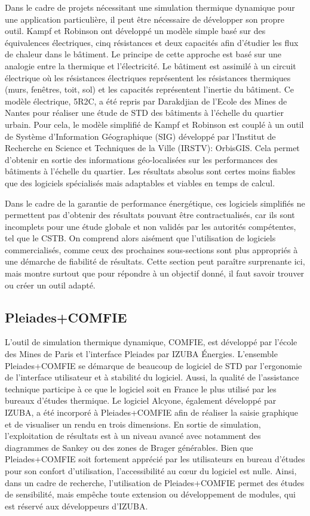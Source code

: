 Dans le cadre de projets nécessitant une simulation thermique dynamique pour une application particulière, il peut être nécessaire de développer son propre outil. Kampf et Robinson \cite{Kampf-07} ont développé un modèle simple basé sur des équivalences électriques, cinq résistances et deux capacités afin d'étudier les flux de chaleur dans le bâtiment. Le principe de cette approche est basé sur une analogie entre la thermique et l'électricité. Le bâtiment est assimilé à un circuit électrique où les résistances électriques représentent les résistances thermiques (murs, fenêtres, toit, sol) et les capacités représentent l'inertie du bâtiment. Ce modèle électrique, 5R2C, a été repris par Darakdjian \cite{Darakdjian-13} de l'Ecole des Mines de Nantes pour réaliser une étude de STD des bâtiments à l'échelle du quartier urbain. Pour cela, le modèle simplifié de Kampf et Robinson est couplé à un outil de Système d'Information Géographique (SIG) développé par l'Institut de Recherche en Science et Techniques de la Ville (IRSTV): OrbisGIS. Cela permet d'obtenir en sortie des informations géo-localisées sur les performances des bâtiments à l'échelle du quartier. Les résultats absolus sont certes moins fiables que des logiciels spécialisés mais adaptables et viables en temps de calcul.

Dans le cadre de la garantie de performance énergétique, ces logiciels simplifiés ne permettent pas d'obtenir des résultats pouvant être contractualisés, car ils sont incomplets pour une étude globale et non validés par les autorités compétentes, tel que le CSTB. On comprend alors aisément que l'utilisation de logiciels commercialisés, comme ceux des prochaines sous-sections sont plus appropriés à une démarche de fiabilité de résultats. Cette section peut paraître surprenante ici, mais montre surtout que pour répondre à un objectif donné, il faut savoir trouver ou créer un outil adapté.

\subsection*{Pleiades+COMFIE}

L'outil de simulation thermique dynamique, COMFIE, est développé par l'école des Mines de Paris et l'interface Pleiades par IZUBA Énergies. L'ensemble Pleiades+COMFIE se démarque de beaucoup de logiciel de STD par l'ergonomie de l'interface utilisateur et à stabilité du logiciel. Aussi, la qualité de l'assistance technique participe à ce que le logiciel soit en France le plus utilisé par les bureaux d'études thermique. Le logiciel Alcyone, également développé par IZUBA, a été incorporé à Pleiades+COMFIE afin de réaliser la saisie graphique et de visualiser un rendu en trois dimensions. En sortie de simulation, l'exploitation de résultats est à un niveau avancé avec notamment des diagrammes de Sankey ou des zones de Brager générables.
Bien que Pleiades+COMFIE soit fortement apprécié par les utilisateurs en bureau d'études pour son confort d'utilisation, l'accessibilité au cœur du logiciel est nulle. Ainsi, dans un cadre de recherche, l'utilisation de Pleiades+COMFIE permet des études de sensibilité, mais empêche toute extension ou développement de modules, qui est réservé aux développeurs d'IZUBA. 

